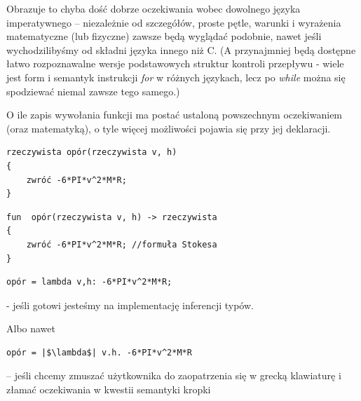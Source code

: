 Obrazuje to chyba dość dobrze oczekiwania wobec dowolnego języka imperatywnego – niezależnie od szczegółów, proste pętle, warunki i wyrażenia matematyczne (lub fizyczne) zawsze będą wyglądać podobnie, nawet jeśli wychodzilibyśmy od składni języka innego niż C. (A przynajmniej będą dostępne łatwo rozpoznawalne wersje podstawowych struktur kontroli przepływu - wiele jest form i semantyk instrukcji \textit{for} w różnych językach, lecz po \textit{while} można się spodziewać niemal zawsze tego samego.)

O ile zapis wywołania funkcji ma postać ustaloną powszechnym oczekiwaniem (oraz matematyką), o tyle więcej możliwości pojawia się przy jej deklaracji.
\begin{lstlisting}
rzeczywista opór(rzeczywista v, h)
{
	zwróć -6*PI*v^2*M*R;
}
\end{lstlisting}

\begin{lstlisting}
fun  opór(rzeczywista v, h) -> rzeczywista
{
	zwróć -6*PI*v^2*M*R; //formuła Stokesa
}
\end{lstlisting}

\begin{lstlisting}
opór = lambda v,h: -6*PI*v^2*M*R;\end{lstlisting} 

- jeśli gotowi jesteśmy na implementację inferencji typów.

Albo nawet 

\lstset{
    escapechar=|,
    breaklines=true
}
\begin{lstlisting}
opór = |$\lambda$| v.h. -6*PI*v^2*M*R\end{lstlisting} – jeśli chcemy zmuszać użytkownika do zaopatrzenia się w grecką klawiaturę i złamać oczekiwania w kwestii semantyki kropki

